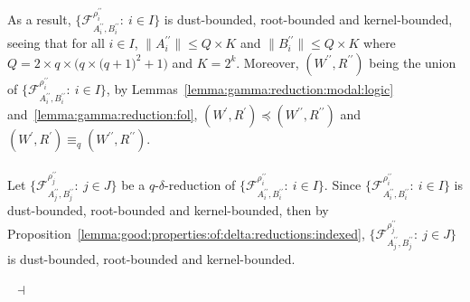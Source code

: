 \documentclass[draft]{article}
\newenvironment{proof}{{\bf Proof:}}{~$\dashv$\\}
\begin{document}
\begin{proof}
\begin{itemize}
%
%
%
%
%
%
\end{itemize}
%
%
As a result, $\{{\mathcal F}_{A_{i}^{\prime\prime},B_{i}^{\prime\prime}}^{\rho_{i}^{\prime\prime}}:\ i{\in}I\}$ is dust-bounded, root-bounded and kernel-bounded, seeing that for all $i{\in}I$, ${\parallel}A_{i}^{\prime\prime}{\parallel}{\leq}Q{\times}K$ and ${\parallel}B_{i}^{\prime\prime}{\parallel}{\leq}Q{\times}K$ where $Q{=}2{\times}q{\times}(q{\times}(q{+}
%
%
%
%
%
%
%
%
%
%
%
%
$\linebreak$
%
%
%
%
%
%
%
%
%
%
%
%
1)^{2}+1)$ and $K{=}2^{k}$.
Moreover, $(W^{\prime\prime},R^{\prime\prime})$ being the union of $\{{\mathcal F}_{A_{i}^{\prime\prime},B_{i}^{\prime\prime}}^{\rho_{i}^{\prime\prime}}:\ i{\in}I\}$, by Lemmas~\ref{lemma:gamma:reduction:modal:logic} and~\ref{lemma:gamma:reduction:fol}, $(W^{\prime},R^{\prime}){\preceq}(W^{\prime\prime},R^{\prime\prime})$ and $(W^{\prime},R^{\prime}){\equiv_{q}}(W^{\prime\prime},R^{\prime\prime})$.
%
%
%
%
%
%
%
%
%
%
\\
\\
%
%
Let $\{{\mathcal F}_{A_{j}^{\prime\prime},B_{j}^{\prime\prime}}^{\rho_{j}^{\prime\prime}}:\ j{\in}J\}$ be a $q$-$\delta$-reduction of $\{{\mathcal F}_{A_{i}^{\prime\prime},B_{i}^{\prime\prime}}^{\rho_{i}^{\prime\prime}}:\ i{\in}I\}$.
Since $\{{\mathcal F}_{A_{i}^{\prime\prime},B_{i}^{\prime\prime}}^{\rho_{i}^{\prime\prime}}:\ i{\in}I\}$ is dust-bounded, root-bounded and kernel-bounded, then by Proposition~\ref{lemma:good:properties:of:delta:reductions:indexed}, $\{{\mathcal F}_{A_{j}^{\prime\prime},B_{j}^{\prime\prime}}^{\rho_{j}^{\prime\prime}}:\ j{\in}J\}$ is dust-bounded, root-bounded and kernel-bounded.

\end{proof}
\end{document}
